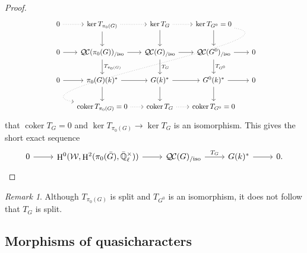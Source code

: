 \documentclass[CM,Submssn,SecEq]{degruyter-crelle} %
\theoremstyle{plain}
\theoremstyle{definition}
\theoremstyle{remark}
\newtheorem{remark}[theorem]{Remark}
\newcommand{\EE}{\mathbb{\bar Q}_\ell}
\newcommand{\Fq}{k}
\newcommand{\EEx}{\EE^\times}
\newcommand{\Weil}[1]{\mathcal{W}_{#1}}
\DeclareMathOperator{\coker}{coker}
\DeclareMathOperator{\Hh}{H}
\newcommand{\TrFrob}[1]{T_{#1}}
\newcommand{\QC}{{\mathcal{Q\hskip-0.8pt C}}}
\newcommand{\QCiso}[1]{\QC(#1)_{/\text{iso}}}
\newcommand{\bG}{\bar{G}}
\begin{document}
\begin{proof}
 \[
  \begin{tikzcd}[row sep=20, column sep=15]
    0 \arrow[dotted]{r} & \ker \TrFrob{\pi_0(G)} \arrow[dotted]{r} \dar & \arrow{d} \ker \TrFrob{G} \arrow[dotted]{r} & \ker \TrFrob{G^0} =0 \arrow[dotted, out=-10, in=170]{dddll} \dar & \\
    0 \rar & \QCiso{\pi_0(G)} \rar \dar{\TrFrob{\pi_0(G)}}
    & \QCiso{G} \rar \dar{\TrFrob{G}} & \QCiso{G^0} \rar \dar{\TrFrob{G^0}} & 0\\
    0 \rar & \pi_0(G)(\Fq)^* \rar \dar
    & \arrow{d} G(\Fq)^* \rar & G^0(\Fq)^* \rar \dar & 0\\
   &  \coker \TrFrob{\pi_0(G)} =0 \arrow[dotted]{r} & \coker \TrFrob{G} \arrow[dotted]{r} & \coker \TrFrob{G^0} =0 & 
  \end{tikzcd}
  \]
that $\coker \TrFrob{G} =0$
and $\ker \TrFrob{\pi_0(G)} \to \ker \TrFrob{G}$ is an isomorphism.
This gives the short exact sequence
\[
  \begin{tikzcd}
0 \arrow{r} & \Hh^0(\Weil{},\Hh^2(\pi_0(\bG),\EEx)) \arrow{r} & \QCiso{G} \arrow{r}{\TrFrob{G}} & G(\Fq)^* \arrow{r} & 0. 
  \end{tikzcd}
\]
\end{proof}

\begin{remark}
Although $\TrFrob{\pi_0(G)}$ is split and $\TrFrob{G^0}$ is an isomorphism, it does not follow that $\TrFrob{G}$ is split. 
\end{remark}

\subsection{Morphisms of quasicharacters} \label{ssec:qcmor}
\end{document}
